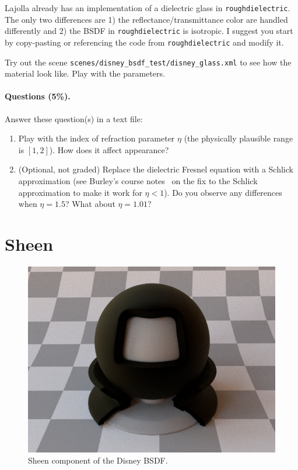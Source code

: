 Lajolla already has an implementation of a dielectric glass in \lstinline{roughdielectric}. The only two differences are 1) the reflectance/transmittance color are handled differently and 2) the BSDF in \lstinline{roughdielectric} is isotropic. I suggest you start by copy-pasting or referencing the code from \lstinline{roughdielectric} and modify it.

Try out the scene \lstinline{scenes/disney_bsdf_test/disney_glass.xml} to see how the material look like. Play with the parameters.

\paragraph{Questions (5\%).} Answer these question(s) in a text file:
\begin{enumerate}
	\item Play with the index of refraction parameter $\eta$ (the physically plausible range is $[1, 2]$). How does it affect appearance?
	\item (Optional, not graded) Replace the dielectric Fresnel equation with a Schlick approximation (see Burley's course notes~\cite{Burley:2015:EDB} on the fix to the Schlick approximation to make it work for $\eta < 1$). Do you observe any differences when $\eta=1.5$? What about $\eta=1.01$?
\end{enumerate}

\section{Sheen}
\begin{figure}
	\centering
	\includegraphics[width=0.5\linewidth]{imgs/disney_sheen.png}
	\caption{Sheen component of the Disney BSDF.}
\end{figure}

